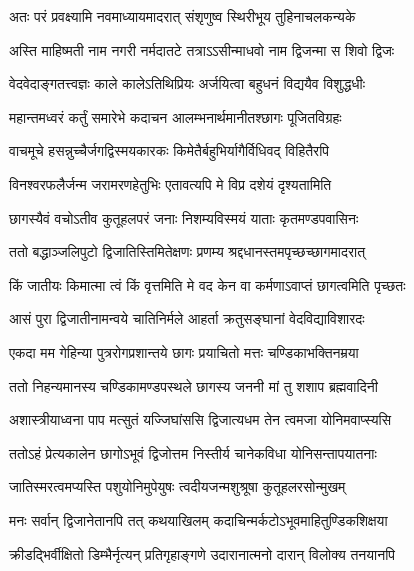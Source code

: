 
\twolineshloka
{अतः परं प्रवक्ष्यामि नवमाध्यायमादरात्}
{संशृणुष्व स्थिरीभूय तुहिनाचलकन्यके} %

\twolineshloka
{अस्ति माहिष्मती नाम नगरी नर्मदातटे}
{तत्राऽऽसीन्माधवो नाम द्विजन्मा स शिवो द्विजः} %

\twolineshloka
{वेदवेदाङ्गतत्त्वज्ञः काले कालेऽतिथिप्रियः}
{अर्जयित्वा बहुधनं विद्ययैव विशुद्धधीः} %

\twolineshloka
{महान्तमध्वरं कर्तुं समारेभे कदाचन}
{आलम्भनार्थमानीतश्छागः पूजितविग्रहः} %

\twolineshloka
{वाचमूचे हसन्नुच्चैर्जगद्विस्मयकारकः}
{किमेतैर्बहुभिर्यागैर्विधिवद् विहितैरपि} %

\twolineshloka
{विनश्वरफलैर्जन्म जरामरणहेतुभिः}
{एतावत्यपि मे विप्र दशेयं दृश्यतामिति} %

\twolineshloka
{छागस्यैवं वचोऽतीव कुतूहलपरं जनाः}
{निशम्यविस्मयं याताः कृतमण्डपवासिनः} %

\twolineshloka
{ततो बद्धाञ्जलिपुटो द्विजातिस्तिमितेक्षणः}
{प्रणम्य श्रद्दधानस्तमपृच्छच्छागमादरात्} %


\twolineshloka
{किं जातीयः किमात्मा त्वं किं वृत्तमिति मे वद}
{केन वा कर्मणाऽवाप्तं छागत्वमिति पृच्छतः} %


\twolineshloka
{आसं पुरा द्विजातीनामन्वये चातिनिर्मले}
{आहर्ता क्रतुसङ्घानां वेदविद्याविशारदः} %

\twolineshloka
{एकदा मम गेहिन्या पुत्ररोगप्रशान्तये}
{छागः प्रयाचितो मत्तः चण्डिकाभक्तिनम्रया} %

\twolineshloka
{ततो निहन्यमानस्य चण्डिकामण्डपस्थले}
{छागस्य जननी मां तु शशाप ब्रह्मवादिनी} %

\twolineshloka
{अशास्त्रीयाध्वना पाप मत्सुतं यज्जिघांससि}
{द्विजात्यधम तेन त्वमजा योनिमवाप्स्यसि} %

\twolineshloka
{ततोऽहं प्रेत्यकालेन छागोऽभूवं द्विजोत्तम}
{निस्तीर्य चानेकविधा योनिसन्तापयातनाः} %


\twolineshloka
{जातिस्मरत्वमप्यस्ति पशुयोनिमुपेयुषः}
{त्वदीयजन्मशुश्रूषा कुतूहलरसोन्मुखम्} %


\twolineshloka
{मनः सर्वान् द्विजानेतानपि तत् कथयाखिलम्}
{कदाचिन्मर्कटोऽभूवमाहितुण्डिकशिक्षया} %

\twolineshloka
{क्रीडद्भिर्वीक्षितो डिम्भैर्नृत्यन् प्रतिगृहाङ्गणे}
{उदारानात्मनो दारान् विलोक्य तनयानपि} %

